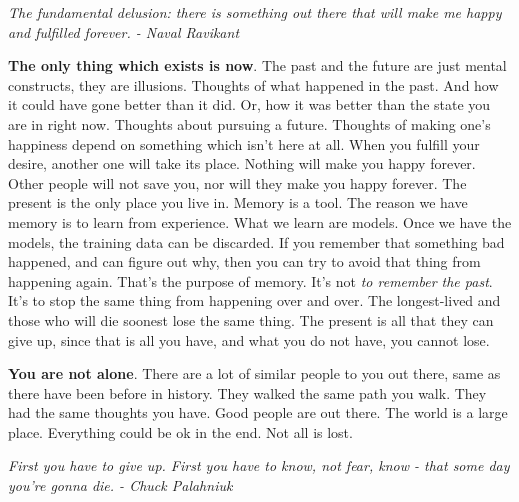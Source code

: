 \documentclass[a4paper,hidelinks]{article}
\begin{document}
\newpage

\begin{center}
\textit{
The fundamental delusion: there is something out there that will make me happy and fulfilled forever. - Naval Ravikant
}
\end{center}

\textbf{The only thing which exists is now}.
The past and the future are just mental constructs, they are illusions.
Thoughts of what happened in the past.
And how it could have gone better than it did.
Or, how it was better than the state you are in right now.
Thoughts about pursuing a future.
Thoughts of making one's happiness depend on something which isn't here at all.
When you fulfill your desire, another one will take its place.
Nothing will make you happy forever.
Other people will not save you, nor will they make you happy forever.
The present is the only place you live in.
Memory is a tool.
The reason we have memory is to learn from experience.
What we learn are models.
Once we have the models, the training data can be discarded.
If you remember that something bad happened, and can figure out why, then you can try to avoid that thing from happening again.
That's the purpose of memory.
It’s not \textit{to remember the past}.
It’s to stop the same thing from happening over and over.
The longest-lived and those who will die soonest lose the same thing.
The present is all that they can give up, since that is all you have, and what you do not have, you cannot lose.

\newpage

\textbf{You are not alone}.
There are a lot of similar people to you out there, same as there have been before in history.
They walked the same path you walk.
They had the same thoughts you have.
Good people are out there.
The world is a large place.
Everything could be ok in the end.
Not all is lost.

\newpage

\begin{center}
\textit{
First you have to give up. First you have to know, not fear, know - that some day you’re gonna die. - Chuck Palahniuk
}
\end{center}
\end{document}
